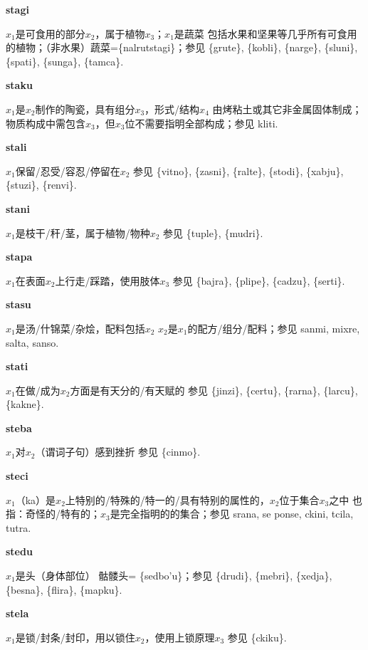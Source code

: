 \documentclass[notitlepage,twocolumn,a4paper,10pt]{book}
\begin{document}
{\sffamily\bfseries stagi} $x_1$是可食用的部分$x_2$，属于植物$x_3$；$x_1$是蔬菜 \textemdash{} 包括水果和坚果等几乎所有可食用的植物；（非水果）蔬菜=\{nalrutstagi\}；参见 \{grute\}, \{kobli\}, \{narge\}, \{sluni\}, \{spati\}, \{sunga\}, \{tamca\}.

{\sffamily\bfseries staku}\enspace {\ttfamily\bfseries[tak]}  $x_1$是$x_2$制作的陶瓷，具有组分$x_3$，形式\slash{}结构$x_4$ \textemdash{} 由烤粘土或其它非金属固体制成；物质构成中需包含$x_3$，但$x_3$位不需要指明全部构成；参见 {kliti}.

{\sffamily\bfseries stali}\enspace {\ttfamily\bfseries[    sta]}  $x_1$保留\slash{}忍受\slash{}容忍\slash{}停留在$x_2$ \textemdash{} 参见 \{vitno\}, \{zasni\}, \{ralte\}, \{stodi\}, \{xabju\}, \{stuzi\}, \{renvi\}.

{\sffamily\bfseries stani} $x_1$是枝干\slash{}秆\slash{}茎，属于植物\slash{}物种$x_2$ \textemdash{} 参见 \{tuple\}, \{mudri\}.

{\sffamily\bfseries stapa}\enspace {\ttfamily\bfseries[tap]}  $x_1$在表面$x_2$上行走\slash{}踩踏，使用肢体$x_3$ \textemdash{} 参见 \{bajra\}, \{plipe\}, \{cadzu\}, \{serti\}.

{\sffamily\bfseries stasu} $x_1$是汤\slash{}什锦菜\slash{}杂烩，配料包括$x_2$ \textemdash{} $x_2$是$x_1$的配方\slash{}组分\slash{}配料；参见 {sanmi}, {mixre}, {salta}, {sanso}.

{\sffamily\bfseries stati} $x_1$在做\slash{}成为$x_2$方面是有天分的\slash{}有天赋的 \textemdash{} 参见 \{jinzi\}, \{certu\}, \{rarna\}, \{larcu\}, \{kakne\}.

{\sffamily\bfseries steba}\enspace {\ttfamily\bfseries[seb]}  $x_1$对$x_2$（谓词子句）感到挫折 \textemdash{} 参见 \{cinmo\}.

{\sffamily\bfseries steci}\enspace {\ttfamily\bfseries[tec     te'i]}  $x_1$（ka）是$x_2$上特别的\slash{}特殊的\slash{}特一的\slash{}具有特别的属性的，$x_2$位于集合$x_3$之中 \textemdash{} 也指：奇怪的\slash{}特有的；$x_3$是完全指明的的集合；参见 {srana}, se {ponse}, {ckini}, {tcila}, {tutra}.

{\sffamily\bfseries stedu}\enspace {\ttfamily\bfseries[sed]}  $x_1$是头（身体部位） \textemdash{} 骷髅头= \{sedbo'u\}；参见 \{drudi\}, \{mebri\}, \{xedja\}, \{besna\}, \{flira\}, \{mapku\}.

{\sffamily\bfseries stela}\enspace {\ttfamily\bfseries[tel]}  $x_1$是锁\slash{}封条\slash{}封印，用以锁住$x_2$，使用上锁原理$x_3$ \textemdash{} 参见 \{ckiku\}.
\end{document}
